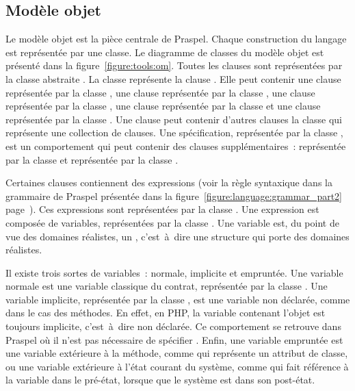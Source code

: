 \subsection{Modèle objet}
\label{subsection:tools:model}

\begin{sidewaysfigure}


\caption{\label{figure:tools:om} Modèle objet de Praspel.}

\end{sidewaysfigure}

Le modèle objet est la pièce centrale de Praspel. Chaque construction du langage
est représentée par une classe. Le diagramme de classes du modèle objet est
présenté dans la figure~\ref{figure:tools:om}. Toutes les clauses sont
représentées par la classe abstraite . La classe 
représente la clause \abehavior. Elle peut contenir une clause \arequires
représentée par la classe , une clause \aensures représentée par
la classe , une clause \athrowable représentée par la classe
, une clause \adescription représentée par la classe
 et une clause \adefault représentée par la classe
. Une clause \abehavior peut contenir d'autres clauses
\abehavior \via la classe  qui représente une collection de
clauses. Une spécification, représentée par la classe , est
un comportement qui peut contenir des clauses supplémentaires~: \ainvariant
représentée par la classe  et \ais représentée par la classe
.

Certaines clauses contiennent des expressions (voir la règle syntaxique
 dans la grammaire de Praspel présentée dans la
figure~\ref{figure:language:grammar_part2}
page~\pageref{figure:language:grammar_part2}). Ces expressions sont représentées
par la classe . Une expression est composée de variables,
représentées par la classe . Une variable est, du point de vue
des domaines réalistes, un , c'est~à~dire une structure qui
porte des domaines réalistes.

Il existe trois sortes de variables~: normale, implicite et empruntée. Une
variable normale est une variable classique du contrat, représentée par la
classe . Une variable implicite, représentée par la classe
, est une variable non déclarée, comme  dans le cas
des méthodes. En effet, en PHP, la variable contenant l'objet est toujours
implicite, c'est~à~dire non déclarée. Ce comportement se retrouve dans Praspel
où il n'est pas nécessaire de spécifier . Enfin, une variable
empruntée est une variable extérieure à la méthode, comme  qui
représente un attribut de classe, ou une variable extérieure à l'état courant du
système, comme  qui fait référence à la variable  dans
le pré-état, lorsque que le système est dans son post-état.

